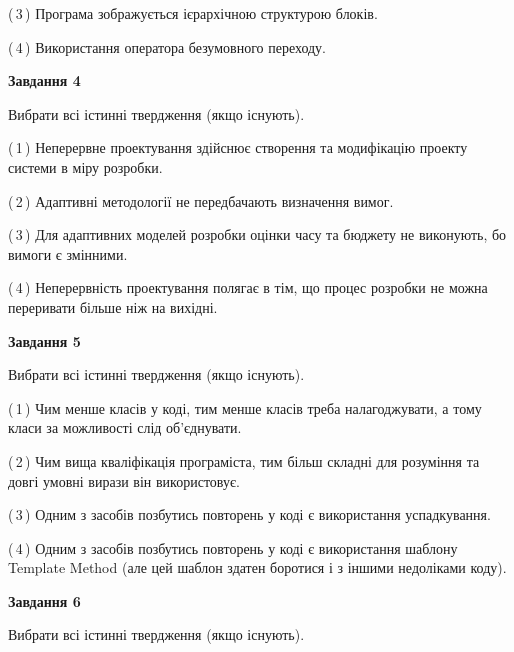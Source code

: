 \documentclass[10pt, ukrainian]{article}
\begin{document}
{\begin {large}
(\,3\,) Програма зображується ієрархічною структурою блоків.%



(\,4\,) Використання оператора безумовного переходу. %


{\begin {center}\textbf{Завдання 4}\end {center}}\par
Вибрати всі істинні твердження (якщо існують).\par
\vspace{2mm}



(\,1\,) Неперервне проектування здійснює створення та модифікацію проекту системи в міру розробки. %



(\,2\,) Адаптивні методології не передбачають визначення вимог. %



(\,3\,) Для адаптивних моделей розробки оцінки часу та бюджету не виконують, бо вимоги є змінними. %



(\,4\,) Неперервність проектування полягає в тім, що процес розробки не можна переривати більше ніж на вихідні. %


{\begin {center}\textbf{Завдання 5}\end {center}}\par
Вибрати всі істинні твердження (якщо існують).\par
\vspace{2mm}



(\,1\,) Чим менше класів у коді, тим менше класів треба налагоджувати, а тому класи за можливості слід об'єднувати. %



(\,2\,) Чим вища кваліфікація програміста, тим більш складні для розуміння та довгі умовні вирази він використовує. %



(\,3\,) Одним з засобів позбутись повторень у коді є використання успадкування. %



(\,4\,) Одним з засобів позбутись повторень у коді є використання шаблону Template Method (але цей шаблон здатен боротися і з іншими недоліками коду). %

\newpage

{\begin {center}\textbf{Завдання 6}\end {center}}\par
Вибрати всі істинні твердження (якщо існують).\par
\vspace{2mm}




\end{large}}
\end{document}
